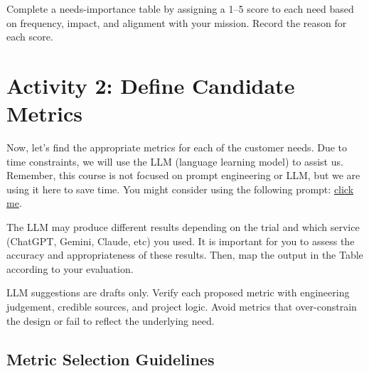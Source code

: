 \begin{tcolorbox}[title=Checkpoint]
Complete a needs-importance table by assigning a 1--5 score to each need based on frequency, impact, and alignment with your mission. Record the reason for each score.
\end{tcolorbox}

\section{Activity 2: Define Candidate Metrics}

Now, let's find the appropriate metrics for each of the customer needs. Due to time constraints, we will use the LLM (language learning model) to assist us. Remember, this course is not focused on prompt engineering or LLM, but we are using it here to save time. You might consider using the following prompt: \href{https://gist.github.com/balandongiv/b63414ea1f72e311bfdd2f1bdc5468dd}{click me}.


The LLM may produce different results depending on the trial and which service (ChatGPT, Gemini, Claude, etc) you used. It is important for you to assess the accuracy and appropriateness of these results. Then, map the output in the Table %
according to your evaluation.

\begin{tcolorbox}[title=Common Mistakes]
LLM suggestions are drafts only. Verify each proposed metric with engineering judgement, credible sources, and project logic. Avoid metrics that over-constrain the design or fail to reflect the underlying need.
\end{tcolorbox}


\subsection{Metric Selection Guidelines}



